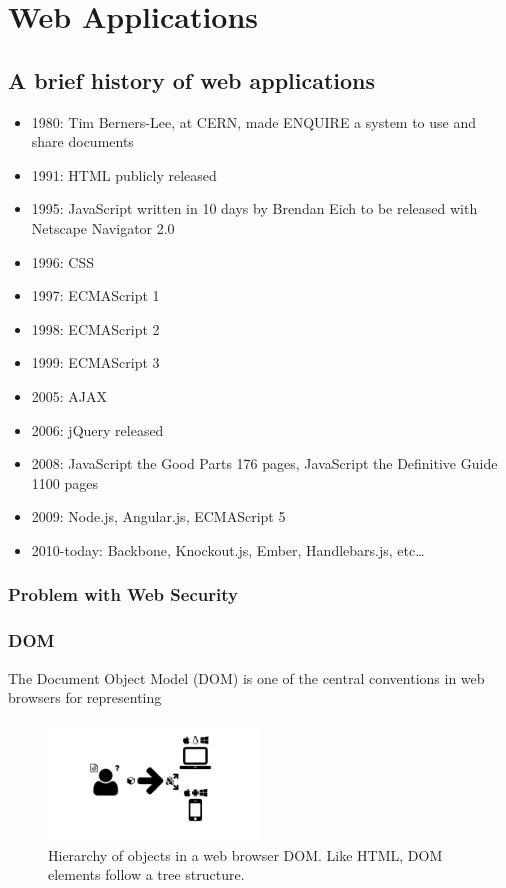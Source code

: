 \chapter{Web Applications}
\label{appendix-web}
\section{A brief history of web applications}
\label{appendix-web-history}

\autocite{w3c2014history}
\autocite{berners2014design}
\begin{itemize}
  \item 1980: Tim Berners-Lee, at CERN, made ENQUIRE a system to use and share documents
  \item 1991: HTML publicly released
  \item 1995: JavaScript written in 10 days by Brendan Eich to be released with Netscape Navigator 2.0
  \item 1996: CSS
  \item 1997: ECMAScript 1
  \item 1998: ECMAScript 2
  \item 1999: ECMAScript 3
  \item 2005: AJAX \autocite{garrett2005ajax}
  \item 2006: jQuery released
  \item 2008: JavaScript the Good Parts 176 pages, JavaScript the Definitive Guide 1100 pages
  \item 2009: Node.js, Angular.js, ECMAScript 5
  \item 2010-today: Backbone, Knockout.js, Ember, Handlebars.js, etc\ldots
\end{itemize}

\subsection{Problem with Web Security}

\autocite{grier2008secure}

\subsection{DOM}

The Document Object Model (DOM) is one of the central conventions in web browsers for representing

\begin{figure}
  \centering
  \includegraphics[width=0.5\textwidth, page=22, trim=0cm 0cm 11cm 0cm, clip=true]{images/Figures.pdf}
  \caption{Hierarchy of objects in a web browser DOM. Like HTML, DOM elements follow a tree structure.}
  \label{Figure:dom}
\end{figure}


